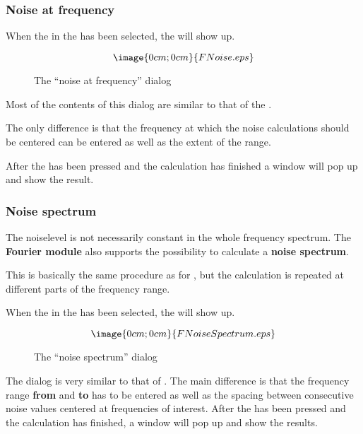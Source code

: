\subsubsection{Noise at frequency}%
\label{fourier.noisefrequency}
When the  in the 
has been selected, the
will show up.
\begin{figure}[h]%
\label{fourier.noisefrequency.dialog}
$$\image{0cm;0cm}{FNoise.eps}$$%
\caption{The ``noise at frequency'' dialog}%
\end{figure}

Most of the contents of this dialog are similar to that of the
.

The only difference is that the frequency at which the noise
calculations should be centered can be entered as well as
the extent of the range.

After the  has been pressed and the calculation has finished
a window will pop up and show the result.

\subsubsection{Noise spectrum}%
\label{fourier.noisespectrum}
The noiselevel is not necessarily constant in the whole frequency spectrum.
The {\bf Fourier module} also supports the possibility to calculate a
{\bf noise spectrum}.

This is basically the same procedure as for
, but the calculation
is repeated at different parts of the frequency range.

When the  in the 
has been selected, the
will show up.
\begin{figure}[h]
$$\image{0cm;0cm}{FNoiseSpectrum.eps}$$%
\caption{The ``noise spectrum'' dialog}%
\label{fourier.noisespectrum.dialog}
\end{figure}

The dialog is very similar to that of 
.
The main difference is that the frequency range {\bf from} and {\bf to}
has to be entered as well as the spacing between consecutive
noise values centered at frequencies of interest.
After the  has been pressed and the calculation has finished,
a window will pop up and show the results.

